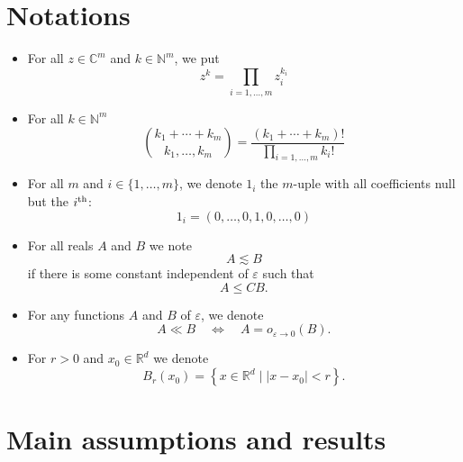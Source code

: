 \documentclass[AHL,Unicode,longabstracts,published]{cedram}
\theoremstyle{plain}
\newcommand*\e{\varepsilon}
\newcommand*\R{{\mathbb R}}
\newcommand*\Cbb{{\mathbb C}}%
\newcommand*\N{{\mathbb N}}
\newcommand*\dsp{\displaystyle}
\begin{document}
\section*{Notations}
\begin{itemize}
\item For all $z\in\Cbb^{m}$ and $k\in\N^{m}$, we put
\begin{equation}\label{1.notation.product}
z^{k} = \prod_{i= 1,\ldots,m} z_i^{k_i}
\end{equation}

\item For all $k\in\N^{m}$
\begin{equation}\label{1.notation.binom}
\binom{k_1 + \cdots + k_m}{k_1,\ldots,k_m} = \frac{\dsp (k_1+\cdots+k_m)!}{\dsp \prod_{i= 1,\ldots,m} k_i! }
\end{equation}

\item For all $m$ and $i\in\{1,\ldots,m\}$, we denote $1_{i}$ the $m$-uple with all coefficients null but the $i^{\rm th}$:
\begin{equation}\label{1.notation.1i}
1_{i} = (0,\ldots,0,1,0,\ldots,0)
\end{equation}

\item For all reals $A$ and $B$ we note
\begin{equation}\label{1.notation.lesssim}
A \lesssim B
\end{equation}
if there is some constant independent of $\e$ such that
\[
A \leq C B.
\]

\item For any functions $A$ and $B$ of $\e$, we denote
\begin{equation}\label{1.notation.ll}
A \ll B \quad \Longleftrightarrow \quad A = o_{\e\to0}(B).
\end{equation}

\item For $r>0$ and $x_0\in\R^{d}$ we denote
\begin{equation}\label{1.notation.ball}
B_{r}(x_0) = \left\{x\in\R^{d} \;\big|\; |x-x_0| < r\right\}.
\end{equation}
\end{itemize}

\section{Main assumptions and results}\label{1.section.assumptions}
\end{document}
